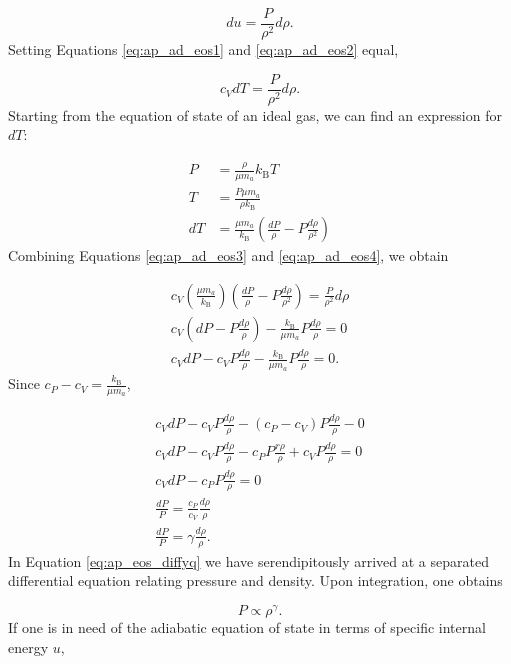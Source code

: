 \documentclass[12pt]{article}
\newcommand{\bigparenthesis}[1]{\left(#1\right)}
\begin{document}
\begin{equation}
    du = \frac{P}{\rho^2} d\rho. \label{eq:ap_ad_eos2}
\end{equation}
%
Setting Equations \ref{eq:ap_ad_eos1} and \ref{eq:ap_ad_eos2} equal,

\begin{equation}
    c_V dT = \frac{P}{\rho^2} d\rho.  \label{eq:ap_ad_eos3}
\end{equation}
%
Starting from the equation of state of an ideal gas, we can find an expression for $dT$:

\begin{align}
    P &= \frac{\rho}{\mu m_a} k_\mathrm{B} T \\
    T &= \frac{P\mu m_a}{\rho k_\mathrm{B}} \\
    dT &= \frac{\mu m_a}{k_\mathrm{B}} \left(\frac{dP}{\rho} - P\frac{d\rho}{\rho^2} \right) \label{eq:ap_ad_eos4}
\end{align}
%
Combining Equations \ref{eq:ap_ad_eos3} and \ref{eq:ap_ad_eos4}, we obtain

\begin{align}
    c_V \bigparenthesis{\frac{\mu m_a}{k_\mathrm{B}}} \bigparenthesis{\frac{dP}{\rho} - P\frac{d\rho}{\rho^2}} = \frac{P}{\rho^2} d\rho \\
    c_V \bigparenthesis{dP - P\frac{d\rho}{\rho}} - \frac{k_\mathrm{B}}{\mu m_a} P \frac{d\rho}{\rho} = 0 \\
    c_V dP - c_V P \frac{d\rho}{\rho} - \frac{k_\mathrm{B}}{\mu m_a} P \frac{d\rho}{\rho} = 0.
\end{align}
%
Since $c_P - c_V = \frac{k_\mathrm{B}}{\mu m_a}$,

\begin{align}
    c_V dP - c_V P \frac{d\rho}{\rho} - \left(c_P - c_V\right) P \frac{d\rho}{\rho} - 0 \\
    c_V dP - c_V P \frac{d\rho}{\rho} - c_P P \frac{r\rho}{\rho} + c_V P \frac{d\rho}{\rho} = 0 \\
    c_V dP - c_P P \frac{d\rho}{\rho} = 0 \\
    \frac{dP}{P} = \frac{c_P}{c_V} \frac{d\rho}{\rho} \\
    \frac{dP}{P} = \gamma \frac{d\rho}{\rho}. \label{eq:ap_eos_diffyq}
\end{align}
%
In Equation \ref{eq:ap_eos_diffyq} we have serendipitously arrived at a separated differential equation relating pressure and density. Upon integration, one obtains

\begin{equation}
    P \propto \rho^\gamma.
\end{equation}
%
If one is in need of the adiabatic equation of state in terms of specific internal energy $u$,
\end{document}
